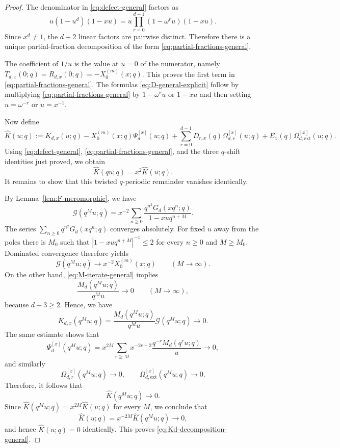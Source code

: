 \documentclass[12pt]{amsart}
\numberwithin{equation}{section}
\begin{document}
\begin{proof}
    
The denominator in \eqref{eq:defect-general} factors as
\[
u(1-u^d)(1-xu)=u\prod_{r=0}^{d-1}(1-\omega^ru)(1-xu).
\]
Since $x^d\neq 1$, the $d+2$ linear factors are pairwise distinct.  Therefore there is a unique partial-fraction decomposition of the form \eqref{eq:partial-fractions-general}.

The coefficient of $1/u$ is the value at $u=0$ of the numerator, namely $T_{d,x}(0;q)=R_{d,x}(0;q)=-X_0^{(m)}(x;q)$.  This proves the first term in \eqref{eq:partial-fractions-general}.  The formulas \eqref{eq:D-general-explicit} follow by multiplying \eqref{eq:partial-fractions-general} by $1-\omega^ru$ or $1-xu$ and then setting $u=\omega^{-r}$ or $u=x^{-1}$.



Now define
\[
\widehat K(u;q)
:=
K_{d,x}(u;q)
-
X_0^{(m)}(x;q)\Psi_d^{[x]}(u;q)
+
\sum_{r=0}^{d-1}D_{r,x}(q)\Omega_{d,r}^{[x]}(u;q)
+
E_x(q)\Omega_{d,\mathrm{ext}}^{[x]}(u;q).
\]
Using \eqref{eq:defect-general}, \eqref{eq:partial-fractions-general}, and the three $q$-shift identities just proved, we obtain
\[
\widehat K(qu;q)=x^2\widehat K(u;q).
\]
It remains to show that this twisted $q$-periodic remainder vanishes identically.

By Lemma~\ref{lem:F-meromorphic}, we have
\[
\mathcal G(q^Mu;q)
=
x^{-2}\sum_{n\geq 0}\frac{q^{n^2}G_d(xq^n;q)}{1-xuq^{n+M}}.
\]
The series $\sum_{n\geq 0} q^{n^2}G_d(xq^n;q)$ converges absolutely.  For fixed $u$ away from the poles there is $M_0$ such that $|1-xuq^{n+M}|^{-1}\leq 2$ for every $n\geq 0$ and $M\geq M_0$.  Dominated convergence therefore yields
\[
\mathcal G(q^Mu;q)\longrightarrow x^{-2}X_0^{(m)}(x;q)
\qquad (M\to\infty).
\]
On the other hand, \eqref{eq:M-iterate-general} implies
\[
\frac{M_d(q^Mu;q)}{q^M u}\longrightarrow 0
\qquad (M\to\infty),
\]
because $d-3\geq 2$.  Hence, we have
\[
K_{d,x}(q^Mu;q)=\frac{M_d(q^Mu;q)}{q^Mu}\mathcal G(q^Mu;q)\longrightarrow 0.
\]
The same estimate shows that
\[
\Psi_d^{[x]}(q^Mu;q)
=
x^{2M}\sum_{r\geq M}x^{-2r-2}\frac{q^{-r}M_d(q^ru;q)}{u}
\longrightarrow 0,
\]
and similarly
\[
\Omega_{d,r}^{[x]}(q^Mu;q)\longrightarrow 0,
\qquad
\Omega_{d,\mathrm{ext}}^{[x]}(q^Mu;q)\longrightarrow 0.
\]
Therefore, it follows that
\[
\widehat K(q^Mu;q)\longrightarrow 0.
\]
Since $\widehat K(q^Mu;q)=x^{2M}\widehat K(u;q)$ for every $M$, we conclude that
\[
\widehat K(u;q)=x^{-2M}\widehat K(q^Mu;q)\longrightarrow 0,
\]
and hence $\widehat K(u;q)=0$ identically.  This proves \eqref{eq:Kd-decomposition-general}.

\end{proof}
\end{document}
